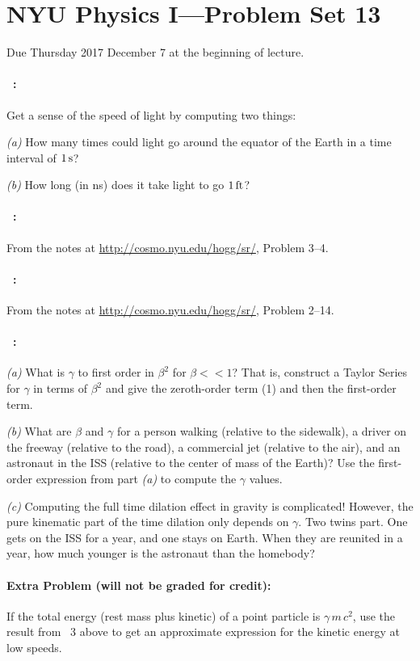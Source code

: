 \documentclass[12pt]{article}
\begin{document}
\section*{NYU Physics I---Problem Set 13}

Due Thursday 2017 December 7 at the beginning of lecture.

\paragraph{\problemname~\theproblem:}%
Get a sense of the speed of light by computing two things:

\textsl{(a)} How many times could light go around the equator of the Earth
in a time interval of $1\,\mathrm{s}$?

\textsl{(b)} How long (in ns) does it take light to go $1\,\mathrm{ft}$?

\paragraph{\problemname~\theproblem:}%
From the notes at \url{http://cosmo.nyu.edu/hogg/sr/},
Problem 3--4.

\paragraph{\problemname~\theproblem:}%
From the notes at \url{http://cosmo.nyu.edu/hogg/sr/},
Problem 2--14.

\paragraph{\problemname~\theproblem:}%
\textsl{(a)} What is $\gamma$ to first order in $\beta^2$ for $\beta
<< 1$? That is, construct a Taylor Series for $\gamma$ in terms of
$\beta^2$ and give the zeroth-order term (1) and then the first-order
term.

\textsl{(b)} What are $\beta$ and $\gamma$ for a person walking
(relative to the sidewalk), a driver on the freeway (relative to the
road), a commercial jet (relative to the air), and an astronaut in the
ISS (relative to the center of mass of the Earth)? Use the first-order
expression from part \textsl{(a)} to compute the $\gamma$ values.

\textsl{(c)} Computing the full time dilation effect in gravity is
complicated! However, the pure kinematic part of the time dilation
only depends on $\gamma$. Two twins part. One gets on the ISS for a
year, and one stays on Earth. When they are reunited in a year, how
much younger is the astronaut than the homebody?

\paragraph{Extra Problem (will not be graded for credit):}%
If the total energy (rest mass plus kinetic) of a point particle is
$\gamma\,m\,c^2$, use the result from \problemname~3 above to get an
approximate expression for the kinetic energy at low speeds.
\end{document}
